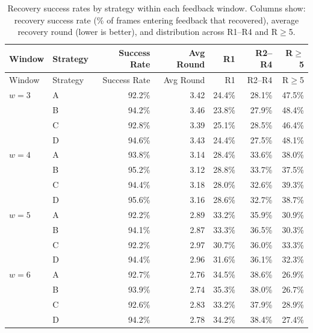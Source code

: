 \begin{center}
\small
\setlength{\tabcolsep}{4.0pt}
\renewcommand{\arraystretch}{1.05}
\begin{longtable}{l l r r r r r}
\caption{Recovery success rates by strategy within each feedback window. Columns show: recovery success rate (\% of frames entering feedback that recovered), average recovery round (lower is better), and distribution across R1--R4 and R$\geq$5.}\label{tab:recovery-by-strategy}\\
\toprule
Window & Strategy & Success Rate & Avg Round & R1 & R2--R4 & R$\geq$5 \\
\midrule
\endfirsthead
\toprule
Window & Strategy & Success Rate & Avg Round & R1 & R2--R4 & R$\geq$5 \\
\midrule
\endhead
\bottomrule
\endfoot
$w=3$ & A & 92.2\% & 3.42 & 24.4\% & 28.1\% & 47.5\% \\
 & B & 94.2\% & 3.46 & 23.8\% & 27.9\% & 48.4\% \\
 & C & 92.8\% & 3.39 & 25.1\% & 28.5\% & 46.4\% \\
 & D & 94.6\% & 3.43 & 24.4\% & 27.5\% & 48.1\% \\
\midrule
$w=4$ & A & 93.8\% & 3.14 & 28.4\% & 33.6\% & 38.0\% \\
 & B & 95.2\% & 3.12 & 28.8\% & 33.7\% & 37.5\% \\
 & C & 94.4\% & 3.18 & 28.0\% & 32.6\% & 39.3\% \\
 & D & 95.6\% & 3.16 & 28.6\% & 32.7\% & 38.7\% \\
\midrule
$w=5$ & A & 92.2\% & 2.89 & 33.2\% & 35.9\% & 30.9\% \\
 & B & 94.1\% & 2.87 & 33.3\% & 36.5\% & 30.3\% \\
 & C & 92.2\% & 2.97 & 30.7\% & 36.0\% & 33.3\% \\
 & D & 94.4\% & 2.96 & 31.6\% & 36.1\% & 32.3\% \\
\midrule
$w=6$ & A & 92.7\% & 2.76 & 34.5\% & 38.6\% & 26.9\% \\
 & B & 93.9\% & 2.74 & 35.3\% & 38.0\% & 26.7\% \\
 & C & 92.6\% & 2.83 & 33.2\% & 37.9\% & 28.9\% \\
 & D & 94.2\% & 2.78 & 34.2\% & 38.4\% & 27.4\% \\
\end{longtable}
\end{center}
